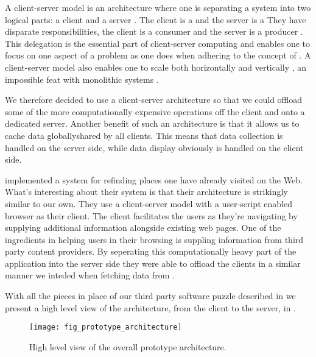 A client-server model is an architecture where one is separating a system into
two logical parts: a client and a server \citep[p.~3]{lewandowski98}. The
client is a 
and the server is a 
They have disparate responsibilities, the client is a consumer and the
server is a producer \citep[p.~3]{lewandowski98}. This delegation is the
essential part of client-server computing and enables one to focus on one
aspect of a problem as one does when adhering to the concept of
 \citep[p.~61]{dijkstra82}.
A client-server model also enables one to scale both horizontally and
vertically%
,
an impossible feat with monolithic systems \citep[pp.~7--8]{lewandowski98}.

We therefore decided to use a client-server architecture so that we could
offload some of the more computationally expensive operations off the client
and onto a dedicated server. Another benefit of such an architecture is that
it allows us to cache data globally\dash{}shared by all clients. This means
that data collection is handled on the server side, while data display
obviously is handled on the client side.

\citet[p.~887--888]{nishimoto06} implemented a system for refinding places one
have already visited on the Web. What's interesting about their system is that
their architecture is strikingly similar to our own. They use a
client-server model with a user-script enabled browser as their client. The
client facilitates the users as they're navigating by supplying additional
information alongside existing web pages. One of the ingredients in helping
users in their browsing is suppling information from third party content
providers. By seperating this computationally heavy part of the application
into the server side they were able to offload the clients in a similar
manner we inteded when fetching data from \urort{}.

With all the pieces in place of our third party software puzzle described in
we present a high level view of the architecture, from the client to the
server, in
.

\begin{figure}
  \begin{whole}
    \centering
    \texttt{[image: fig\_prototype\_architecture]}
    \caption[Prototype Architecture]{
      High level view of the overall prototype architecture.
    }
    \label{figure:fig.prototype.architecture}
  \end{whole}
\end{figure}

